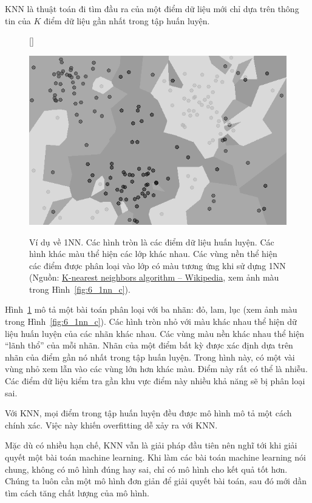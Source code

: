 KNN là thuật toán đi tìm đầu ra của một điểm dữ liệu mới chỉ dựa trên thông tin của $K$ điểm dữ liệu gần nhất trong tập
huấn luyện.
\begin{figure}[t]
[\FBwidth]
{\caption{
Ví dụ về 1NN. Các hình tròn là các điểm dữ liệu huấn luyện. Các hình khác
màu thể hiện các lớp khác nhau. Các vùng nền thể hiện các điểm được phân
loại vào lớp có màu tương ứng khi sử dựng 1NN (Nguồn:
\href{https://en.wikipedia.org/wiki/K-nearest_neighbors_algorithm}{K-nearest
neighbors algorithm  --  Wikipedia}, xem ảnh màu trong Hình~\ref{fig:6_1nn_c}).
}
\label{fig:6_1nn}}
{ %
\includegraphics[width=.5\textwidth]{Chapters/03_SimpleML/6_knn/Map1NN_gray.png}
}
\end{figure}


Hình~\ref{fig:6_1nn} mô tả một bài toán phân loại với ba nhãn: đỏ, lam, lục (xem ảnh màu trong Hình~\ref{fig:6_1nn_c}). Các
hình tròn nhỏ với màu khác nhau thể hiện dữ liệu huấn luyện của các nhãn khác
nhau. Các vùng màu nền khác nhau thể hiện ``lãnh thổ'' của mỗi nhãn. Nhãn của một điểm bất kỳ được xác định dựa trên nhãn của điểm gần nó nhất
trong tập huấn luyện. Trong hình này, có một vài vùng nhỏ xem lẫn vào các
vùng lớn hơn khác màu. Điểm này rất có thể là nhiễu. Các điểm dữ liệu kiểm tra gần khu vực điểm này nhiều khả năng sẽ bị phân loại sai.

Với KNN, mọi điểm trong tập
huấn luyện đều được mô hình mô tả một cách chính xác. Việc này khiến overfitting dễ xảy ra với KNN.

Mặc dù có nhiều hạn chế, KNN vẫn là giải pháp đầu tiên nên nghĩ tới khi giải
quyết một bài toán machine learning. {Khi làm các bài toán machine
learning nói chung, không có mô hình đúng hay sai, chỉ có mô hình cho kết quả
tốt hơn. Chúng ta luôn cần một mô hình đơn giản để giải quyết bài toán, sau đó mới dần tìm cách tăng chất lượng của mô hình.}



